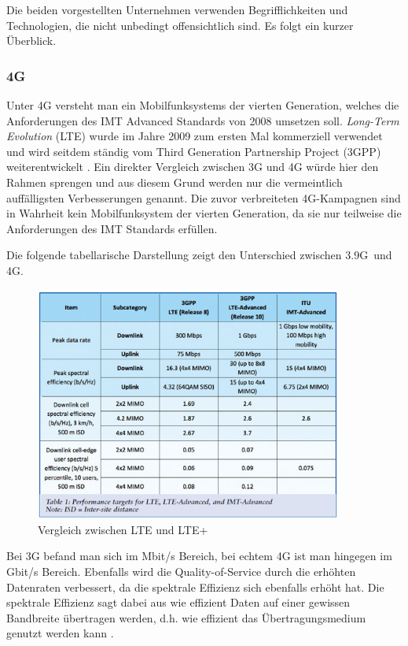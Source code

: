 Die beiden vorgestellten Unternehmen verwenden Begrifflichkeiten und Technologien, die nicht unbedingt offensichtlich sind. Es folgt ein kurzer Überblick. 

\subsubsection{4G}

Unter 4G versteht man ein Mobilfunksystems der vierten Generation, welches die Anforderungen des IMT Advanced Standards von 2008 umsetzen soll. \textit{Long-Term Evolution} (LTE) wurde im Jahre 2009 zum ersten Mal kommerziell verwendet und wird seitdem ständig vom Third Generation Partnership Project (3GPP) weiterentwickelt \cite{lte}. Ein direkter Vergleich zwischen 3G und 4G würde hier den Rahmen sprengen und aus diesem Grund werden nur die vermeintlich auffälligsten Verbesserungen genannt. Die zuvor verbreiteten 4G-Kampagnen sind in Wahrheit kein Mobilfunksystem der vierten Generation, da sie nur teilweise die Anforderungen des IMT Standards erfüllen.

Die folgende tabellarische Darstellung zeigt den Unterschied zwischen \glqq 3.9G\grqq \ und 4G.

\begin{figure}[H]
\centering
\includegraphics[width=0.9\textwidth]{pictures/lteadv.jpg}
\caption{Vergleich zwischen LTE und LTE+ \cite{ltevergleich}}
\label{fig:lteplus}
\end{figure}

Bei 3G befand man sich im Mbit/s Bereich, bei echtem 4G ist man hingegen im Gbit/s Bereich. Ebenfalls wird die Quality-of-Service durch die erhöhten Datenraten verbessert, da die spektrale Effizienz sich ebenfalls erhöht hat. Die spektrale Effizienz sagt dabei aus wie effizient Daten auf einer gewissen Bandbreite übertragen werden, d.h. wie effizient das Übertragungsmedium genutzt werden kann \cite{ltevergleich}.   

